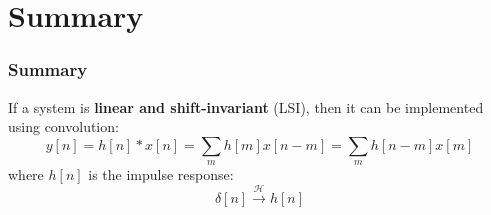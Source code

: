 \documentclass{beamer}
\begin{document}
\section[Summary]{Summary}
\setcounter{subsection}{1}
\begin{frame}
  \frametitle{Summary}

  If a system is {\bf linear and shift-invariant} (LSI), then it can
  be implemented using convolution:
    \[
    y[n] = h[n]\ast x[n] = \sum_m h[m] x[n-m] = \sum_m h[n-m] x[m]
    \]
    where $h[n]$ is the impulse response:
    \[
    \delta[n] \stackrel{\mathcal H}{\longrightarrow}  h[n]
    \]
\end{frame}
\end{document}
